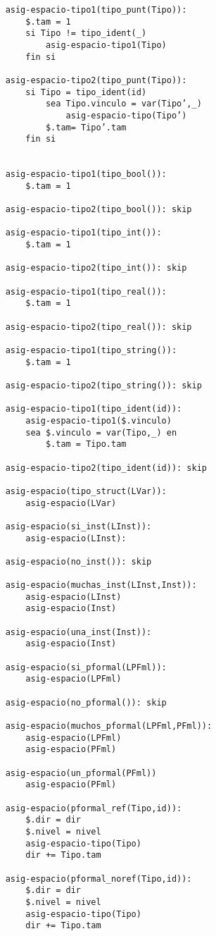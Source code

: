 \begin{lstlisting}
    asig-espacio-tipo1(tipo_punt(Tipo)):
        $.tam = 1
        si Tipo != tipo_ident(_)
            asig-espacio-tipo1(Tipo)
        fin si

    asig-espacio-tipo2(tipo_punt(Tipo)):
        si Tipo = tipo_ident(id)
            sea Tipo.vinculo = var(Tipo’,_)
                asig-espacio-tipo(Tipo’) 
            $.tam= Tipo’.tam
        fin si 
 

    asig-espacio-tipo1(tipo_bool()): 
        $.tam = 1

    asig-espacio-tipo2(tipo_bool()): skip

    asig-espacio-tipo1(tipo_int()): 
        $.tam = 1

    asig-espacio-tipo2(tipo_int()): skip

    asig-espacio-tipo1(tipo_real()): 
        $.tam = 1

    asig-espacio-tipo2(tipo_real()): skip

    asig-espacio-tipo1(tipo_string()): 
        $.tam = 1

    asig-espacio-tipo2(tipo_string()): skip

    asig-espacio-tipo1(tipo_ident(id)):
        asig-espacio-tipo1($.vinculo)
        sea $.vinculo = var(Tipo,_) en
            $.tam = Tipo.tam

    asig-espacio-tipo2(tipo_ident(id)): skip

    asig-espacio(tipo_struct(LVar)):
        asig-espacio(LVar)

    asig-espacio(si_inst(LInst)):
        asig-espacio(LInst):

    asig-espacio(no_inst()): skip

    asig-espacio(muchas_inst(LInst,Inst)):
        asig-espacio(LInst)
        asig-espacio(Inst)

    asig-espacio(una_inst(Inst)):
        asig-espacio(Inst)

    asig-espacio(si_pformal(LPFml)):
        asig-espacio(LPFml)

    asig-espacio(no_pformal()): skip

    asig-espacio(muchos_pformal(LPFml,PFml)):
        asig-espacio(LPFml)
        asig-espacio(PFml)

    asig-espacio(un_pformal(PFml))
        asig-espacio(PFml)

    asig-espacio(pformal_ref(Tipo,id)):
        $.dir = dir
        $.nivel = nivel
        asig-espacio-tipo(Tipo)
        dir += Tipo.tam

    asig-espacio(pformal_noref(Tipo,id)):
        $.dir = dir
        $.nivel = nivel
        asig-espacio-tipo(Tipo)
        dir += Tipo.tam
        


\end{lstlisting}
